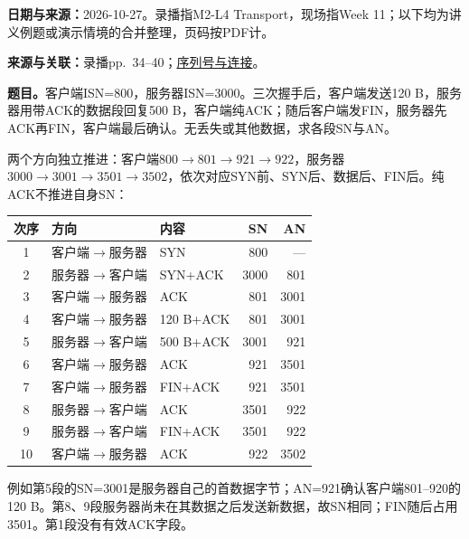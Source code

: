 \begingroup
\renewcommand{\recordid}[1]{}
\renewcommand{\relatedtopic}[2]{\hyperref[topic:#1]{#2}}


\textbf{日期与来源：}2026-10-27。录播指M2-L4 Transport，现场指Week 11；以下均为讲义例题或演示情境的合并整理，页码按PDF计。


\textbf{来源与关联：}录播pp.~34--40；\relatedtopic{SC2008-L08-T02}{序列号与连接}。

\textbf{题目。}客户端ISN=800，服务器ISN=3000。三次握手后，客户端发送120 B，服务器用带ACK的数据段回复500 B，客户端纯ACK；随后客户端发FIN，服务器先ACK再FIN，客户端最后确认。无丢失或其他数据，求各段SN与AN。

\begin{workedsolution}
两个方向独立推进：客户端$800\to801\to921\to922$，服务器$3000\to3001\to3501\to3502$，依次对应SYN前、SYN后、数据后、FIN后。纯ACK不推进自身SN：
\begin{center}
\small
\begin{tabular}{@{}cllrr@{}}
\toprule
次序 & 方向 & 内容 & SN & AN \\
\midrule
1 & 客户端$\to$服务器 & SYN & 800 & --- \\
2 & 服务器$\to$客户端 & SYN+ACK & 3000 & 801 \\
3 & 客户端$\to$服务器 & ACK & 801 & 3001 \\
4 & 客户端$\to$服务器 & 120 B+ACK & 801 & 3001 \\
5 & 服务器$\to$客户端 & 500 B+ACK & 3001 & 921 \\
6 & 客户端$\to$服务器 & ACK & 921 & 3501 \\
7 & 客户端$\to$服务器 & FIN+ACK & 921 & 3501 \\
8 & 服务器$\to$客户端 & ACK & 3501 & 922 \\
9 & 服务器$\to$客户端 & FIN+ACK & 3501 & 922 \\
10 & 客户端$\to$服务器 & ACK & 922 & 3502 \\
\bottomrule
\end{tabular}
\end{center}
例如第5段的SN=3001是服务器自己的首数据字节；AN=921确认客户端801--920的120 B。第8、9段服务器尚未在其数据之后发送新数据，故SN相同；FIN随后占用3501。第1段没有有效ACK字段。
\end{workedsolution}


